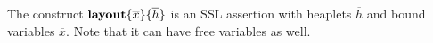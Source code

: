 The construct $\textbf{layout}\{ \overline{x} \}\{ \overline{h} \}$ is an SSL assertion with heaplets $\overline{h}$ and
bound variables $\overline{x}$. Note that it can have free variables as well.

%
%
%
%
%

